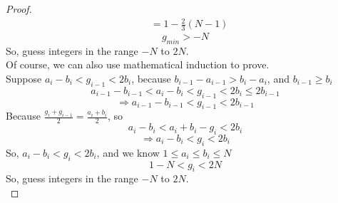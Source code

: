 \documentclass[12pt]{article}
\numberwithin{equation}{section}
\begin{document}
\begin{proof}
\begin{align*}
    &=1-\frac{2}{3}(N-1)
    \end{align*}
    \[g_{min}>-N\]
    So, guess integers in the range $-N$ to $2N$.\\
    Of course, we can also use mathematical induction to prove.\\
    Suppose $a_i-b_i < g_{i-1} < 2b_i$, because $b_{i-1}-a_{i-1} > b_i-a_i$, and $b_{i-1} \geqslant b_i$
    \[a_{i-1}-b_{i-1} < a_i-b_i < g_{i-1} < 2b_i \leqslant 2b_{i-1}\]
    \[\Longrightarrow a_{i-1}-b_{i-1} < g_{i-1} < 2b_{i-1}\]
    Because $\frac{g_i+g_{i-1}}{2}=\frac{a_i+b_i}{2}$, so
    \[a_i-b_i < a_i+b_i-g_i < 2b_i\]
    \[\Longrightarrow a_i-b_i < g_i < 2b_i\]
    So, $a_i-b_i < g_i < 2b_i$, and we know $1 \leqslant a_i \leqslant b_i \leqslant N$
    \[1-N < g_i < 2N\]
    So, guess integers in the range $-N$ to $2N$.\\
\end{proof}
\end{document}
